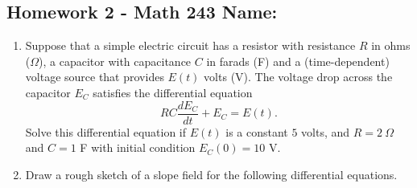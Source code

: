 \documentclass[10pt]{article}
\begin{document}
\pagestyle{empty}
\subsection*{Homework 2 - Math 243 \hfill Name: \underline{\hspace*{2in}}}

\noindent

\begin{enumerate}
\item Suppose that a simple electric circuit has a resistor with resistance $R$ in ohms ($\Omega$), a capacitor with capacitance $C$ in farads (F) and a (time-dependent) voltage source that provides $E(t)$ volts (V).  The voltage drop across the capacitor $E_C$ satisfies the differential equation
$$RC \dfrac{dE_C}{dt} + E_C = E(t).$$
Solve this differential equation if $E(t)$ is a constant $5$ volts, and $R = 2~\Omega$ and $C = 1$ F with initial condition $E_C(0) = 10$ V. 
\vfill

\item Draw a rough sketch of a slope field for the following differential equations. 
\begin{center}
\end{center}
\bigskip


\end{enumerate}
\end{document}
